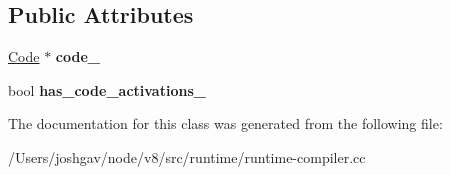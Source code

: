 \subsection*{Public Attributes}
\begin{DoxyCompactItemize}
\item 
\hyperlink{classv8_1_1internal_1_1_code}{Code} $\ast$ {\bfseries code\+\_\+}\hypertarget{classv8_1_1internal_1_1_activations_finder_ac6ed1ea07a59270aae7aaf32f23cb537}{}\label{classv8_1_1internal_1_1_activations_finder_ac6ed1ea07a59270aae7aaf32f23cb537}

\item 
bool {\bfseries has\+\_\+code\+\_\+activations\+\_\+}\hypertarget{classv8_1_1internal_1_1_activations_finder_a0faceafe43a03036d7d86c6aaf231fdf}{}\label{classv8_1_1internal_1_1_activations_finder_a0faceafe43a03036d7d86c6aaf231fdf}

\end{DoxyCompactItemize}


The documentation for this class was generated from the following file\+:\begin{DoxyCompactItemize}
\item 
/\+Users/joshgav/node/v8/src/runtime/runtime-\/compiler.\+cc\end{DoxyCompactItemize}
